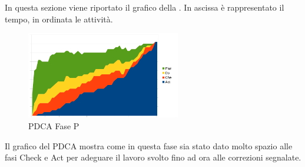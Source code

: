 In questa sezione viene riportato il grafico  della . In ascissa è rappresentato il tempo, in ordinata le attività.
\begin{figure}[H]
	\centering
	\includegraphics[width=0.6\textwidth]{PianoDiQualifica/Pics/GraficoPDCAFaseSD.pdf}
	\caption{PDCA Fase P}
\end{figure}
Il grafico del PDCA mostra come in questa fase sia stato dato molto spazio alle fasi Check e Act per adeguare il lavoro svolto fino ad ora alle correzioni segnalate.

							






